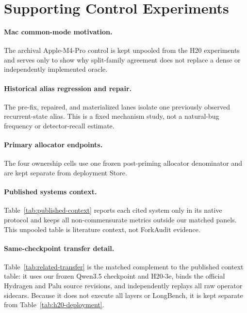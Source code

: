 \documentclass{article}
\begin{document}
\FloatBarrier

\section{Supporting Control Experiments}
\label{app:controls}

\paragraph{Mac common-mode motivation.}
The archival Apple-M4-Pro control is kept unpooled from the H20 experiments and
serves only to show why split-family agreement does not replace a dense or
independently implemented oracle.


\paragraph{Historical alias regression and repair.}
The pre-fix, repaired, and materialized lanes isolate one previously observed
recurrent-state alias.  This is a fixed mechanism study, not a natural-bug
frequency or detector-recall estimate.


\paragraph{Primary allocator endpoints.}
The four ownership cells use one frozen post-priming allocator denominator and
are kept separate from deployment Store.


\paragraph{Published systems context.}
Table~\ref{tab:published-context} reports each cited system only in its native
protocol and keeps all non-commensurate metrics outside our matched panels.
This unpooled table is literature context, not ForkAudit evidence.


\paragraph{Same-checkpoint transfer detail.}
Table~\ref{tab:related-transfer} is the matched complement to the published
context table: it uses our frozen Qwen3.5 checkpoint and H20-3e, binds the
official Hydragen and Palu source revisions, and independently replays all raw
operator sidecars.  Because it does not execute all layers or LongBench, it is
kept separate from Table~\ref{tab:h20-deployment}.

\end{document}
